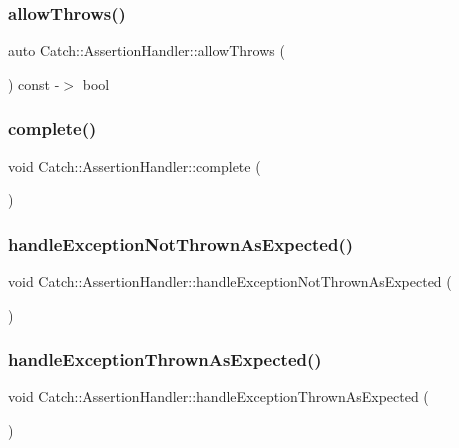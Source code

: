 \subsubsection{allowThrows()}
{\footnotesize\ttfamily auto Catch\+::\+Assertion\+Handler\+::allow\+Throws (\begin{DoxyParamCaption}{ }\end{DoxyParamCaption}) const -\/$>$  bool}

\mbox{\label{class_catch_1_1_assertion_handler_a878a9eb828d8a1863c8dcb6575f6f40e}} 
\subsubsection{complete()}
{\footnotesize\ttfamily void Catch\+::\+Assertion\+Handler\+::complete (\begin{DoxyParamCaption}{ }\end{DoxyParamCaption})}

\mbox{\label{class_catch_1_1_assertion_handler_a51e4936e3af43b74690cedae6d2e297a}} 
\subsubsection{handleExceptionNotThrownAsExpected()}
{\footnotesize\ttfamily void Catch\+::\+Assertion\+Handler\+::handle\+Exception\+Not\+Thrown\+As\+Expected (\begin{DoxyParamCaption}{ }\end{DoxyParamCaption})}

\mbox{\label{class_catch_1_1_assertion_handler_ab6caf765764a4064e90fce829eec201d}} 
\subsubsection{handleExceptionThrownAsExpected()}
{\footnotesize\ttfamily void Catch\+::\+Assertion\+Handler\+::handle\+Exception\+Thrown\+As\+Expected (\begin{DoxyParamCaption}{ }\end{DoxyParamCaption})}

